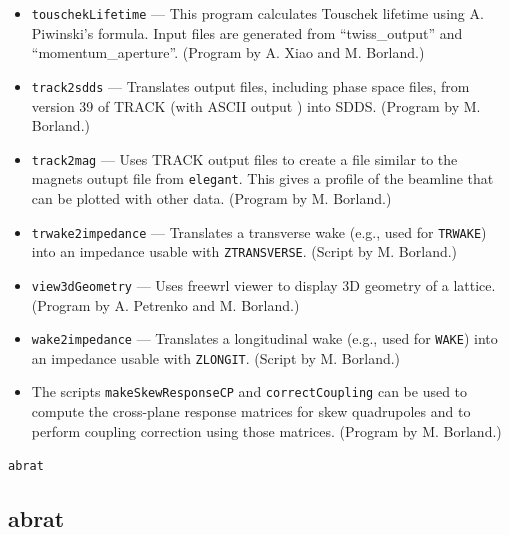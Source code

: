 \documentclass[11pt]{article}
\begin{document}
\begin{itemize}
  \verb|TFBDRIVER| and \verb|TFBPICKUP| elements.
  (Program by M. Borland.)
\item {\tt touschekLifetime} --- This program calculates Touschek lifetime using A. Piwinski's formula.
        Input files are generated from ``twiss\_output'' and ``momentum\_aperture''.  (Program by A. Xiao and M. Borland.)
\item {\tt track2sdds} --- Translates output files, including phase space files, from version 39 of TRACK (with ASCII output \cite{TRACK})
  into SDDS. 
  (Program by M. Borland.)
\item {\tt track2mag} --- Uses TRACK output files to create a file similar to the magnets outupt file from {\tt elegant}.
  This gives a profile of the beamline that can be plotted with other data.
  (Program by M. Borland.)
\item {\tt trwake2impedance} --- Translates a transverse wake (e.g., used for \verb|TRWAKE|) into an impedance usable with
  \verb|ZTRANSVERSE|. (Script by M. Borland.)
\item {\tt view3dGeometry} --- Uses freewrl viewer to display 3D geometry of a lattice. 
  (Program by A. Petrenko and M. Borland.)
\item {\tt wake2impedance} --- Translates a longitudinal wake (e.g., used for \verb|WAKE|) into an impedance usable with
  \verb|ZLONGIT|. (Script by M. Borland.)
\item The scripts \verb|makeSkewResponseCP| and \verb|correctCoupling| can be used to compute the cross-plane response
  matrices for skew quadrupoles and to perform coupling correction using those matrices.
  (Program by M. Borland.)
\end{itemize}

\newpage
\begin{center}{\Large\verb|abrat|}\end{center}
\subsection{abrat}
\end{document}
